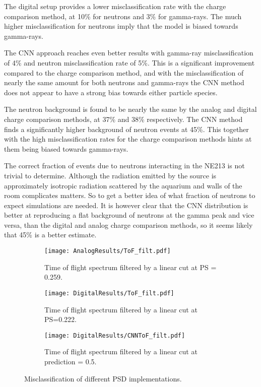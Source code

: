 \documentclass[main.tex]{subfiles}
\begin{document}
The digital setup provides a lower misclassification rate with the charge comparison method, at 10\% for neutrons and 3\% for gamma-rays. The much higher misclassification for neutrons imply that the model is biased towards gamma-rays.

The CNN approach reaches even better results with gamma-ray misclassification of 4\% and neutron misclassification rate of 5\%.
This is a significant improvement compared to the charge comparison method, and with the misclassification of nearly the same amount for both neutrons and gamma-rays the CNN method does not appear to have a strong bias towards either particle species.

The neutron background is found to be nearly the same by the analog and digital charge comparison methods, at 37\% and 38\% respectively. The CNN method finds a significantly higher background of neutron events at 45\%. This together with the high misclassification rates for the charge comparison methods hints at them being biased towards gamma-rays.

The correct fraction of events due to neutrons interacting in the NE213 is not trivial to determine. Although the radiation emitted by the source is approximately isotropic radiation scattered by the aquarium and walls of the room complicates matters. So to get a better idea of what fraction of neutrons to expect simulations are needed. It is however clear that the CNN distribution is better at reproducing a flat background of neutrons at the gamma peak and vice versa, than the digital and analog charge comparison methods, so it seems likely that 45\% is a better estimate.



\begin{figure}
    \centering
    \begin{subfigure}[bh]{\textwidth}
   	   	\centering
	    \texttt{[image: AnalogResults/ToF\_filt.pdf]}
    	\caption{Time of flight spectrum filtered by a linear cut at PS = 0.259.}
    	\label{fig:ToF_filt_A}
   	\end{subfigure}
    \begin{subfigure}[bh]{\textwidth}
   	    \centering
        \texttt{[image: DigitalResults/ToF\_filt.pdf]}
        \caption{Time of flight spectrum filtered by a linear cut at PS=0.222.}
        \label{fig:ToF_filt_D}
    \end{subfigure}
	\begin{subfigure}[bh]{\textwidth}
	    \centering
        \texttt{[image: DigitalResults/CNNToF\_filt.pdf]}
        \caption{Time of flight spectrum filtered by a linear cut at prediction = 0.5.}
        \label{fig:ToF_filt_D_CNN}
    \end{subfigure}
	\caption[Misclassification of different PSD implementations.]{Misclassification of different PSD implementations.}
    \label{fig:tof_cc_cnn}
\end{figure}
\end{document}
